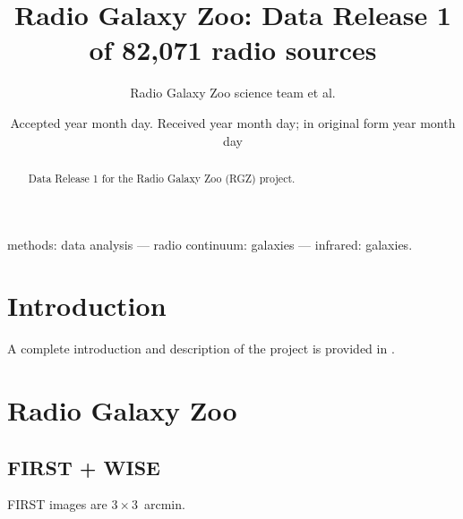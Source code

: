 \documentclass[a4,useAMS,usenatbib]{mn2e}
\title[Radio Galaxy Zoo]{Radio Galaxy Zoo: Data Release 1 of 82,071 radio sources}
\author[RGZ team]{Radio Galaxy Zoo science team et al.
}
\begin{document}
\date{Accepted year month day. Received year month day; in original form year month day}

\pagerange{\pageref{firstpage}--\pageref{lastpage}} 

\maketitle

\label{firstpage}

\begin{abstract}
Data Release 1 for the Radio Galaxy Zoo (RGZ) project.
\end{abstract}
\begin{keywords}
methods: data analysis --- radio continuum: galaxies --- infrared: galaxies. 
\end{keywords}

\section{Introduction}\label{sec:intro}

A complete introduction and description of the project is provided in \citet[][hereafter B15]{ban15}. 

\section{Radio Galaxy Zoo}\label{sec:sample}

\subsection{FIRST + WISE}\label{ssec:sample_first}

FIRST images are $3\times3$~arcmin. 
\end{document}
